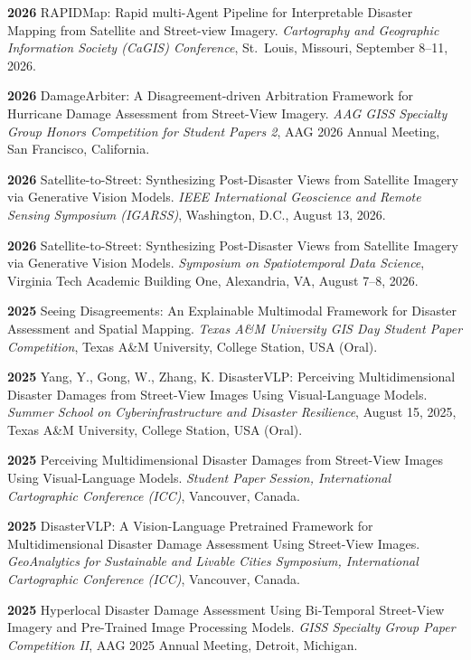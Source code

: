 \documentclass[10pt,letterpaper]{article}
\newenvironment{reflist}
  {\begin{list}{}{%
     \setlength{\leftmargin}{1.7em}\setlength{\itemindent}{-1.7em}%
     \setlength{\itemsep}{0.22em}\setlength{\parsep}{0pt}\setlength{\topsep}{0.25em}}}
  {\end{list}}
\newcommand{\dt}[1]{\textbf{#1}\hspace{0.6em}}
\begin{document}
\begin{reflist}
  \item[] [1] \dt{2026} RAPIDMap: Rapid multi-Agent Pipeline for Interpretable Disaster Mapping from Satellite and Street-view Imagery. \textit{Cartography and Geographic Information Society (CaGIS) Conference}, St.~Louis, Missouri, September 8--11, 2026.
  \item[] [2] \dt{2026} DamageArbiter: A Disagreement-driven Arbitration Framework for Hurricane Damage Assessment from Street-View Imagery. \textit{AAG GISS Specialty Group Honors Competition for Student Papers 2}, AAG 2026 Annual Meeting, San Francisco, California.
  \item[] [3] \dt{2026} Satellite-to-Street: Synthesizing Post-Disaster Views from Satellite Imagery via Generative Vision Models. \textit{IEEE International Geoscience and Remote Sensing Symposium (IGARSS)}, Washington, D.C., August 13, 2026.
  \item[] [4] \dt{2026} Satellite-to-Street: Synthesizing Post-Disaster Views from Satellite Imagery via Generative Vision Models. \textit{Symposium on Spatiotemporal Data Science}, Virginia Tech Academic Building One, Alexandria, VA, August 7--8, 2026.
  \item[] [5] \dt{2025} Seeing Disagreements: An Explainable Multimodal Framework for Disaster Assessment and Spatial Mapping. \textit{Texas A\&M University GIS Day Student Paper Competition}, Texas A\&M University, College Station, USA (Oral).
  \item[] [6] \dt{2025} Yang, Y., Gong, W., Zhang, K. DisasterVLP: Perceiving Multidimensional Disaster Damages from Street-View Images Using Visual-Language Models. \textit{Summer School on Cyberinfrastructure and Disaster Resilience}, August 15, 2025, Texas A\&M University, College Station, USA (Oral).
  \item[] [7] \dt{2025} Perceiving Multidimensional Disaster Damages from Street-View Images Using Visual-Language Models. \textit{Student Paper Session, International Cartographic Conference (ICC)}, Vancouver, Canada.
  \item[] [8] \dt{2025} DisasterVLP: A Vision-Language Pretrained Framework for Multidimensional Disaster Damage Assessment Using Street-View Images. \textit{GeoAnalytics for Sustainable and Livable Cities Symposium, International Cartographic Conference (ICC)}, Vancouver, Canada.
  \item[] [9] \dt{2025} Hyperlocal Disaster Damage Assessment Using Bi-Temporal Street-View Imagery and Pre-Trained Image Processing Models. \textit{GISS Specialty Group Paper Competition II}, AAG 2025 Annual Meeting, Detroit, Michigan.

\end{reflist}
\end{document}

